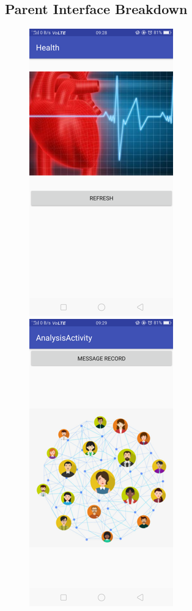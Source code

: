 \documentclass{article}
\begin{document}
\subsection{Parent Interface Breakdown}
\begin{figure}[htbp]
	\centering
	\begin{minipage}[t]{0.30\linewidth}
		\includegraphics{img/Picture4}
	\end{minipage}
	\begin{minipage}[t]{0.30\linewidth}
		\includegraphics{img/Picture5}

\end{minipage}
\end{figure}
\end{document}
